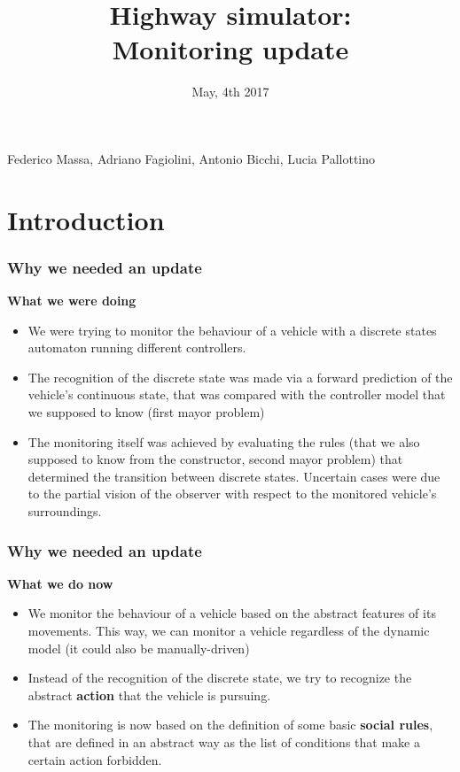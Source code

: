\documentclass{beamer}
\title{Highway simulator: \\
Monitoring update}
\date{\small May, 4th 2017}
\begin{document}

{
\begin{frame}
\titlepage
\bigskip
\medskip
\centering\small Federico Massa, Adriano Fagiolini, Antonio Bicchi, Lucia Pallottino
\end{frame}}
\addtocounter{framenumber}{-1}

\section{Introduction}
\begin{frame}
\frametitle{Why we needed an update}
\textbf{What we were doing}
\begin{itemize}
	\item We were trying to monitor the behaviour of a vehicle
		  with a discrete states automaton running different
		  controllers.
 	\item The recognition of the discrete state was made via 
 		  a forward prediction of the vehicle's continuous state,
 		  that was compared with the controller model that we
 		  supposed to know (first mayor problem)
  	\item The monitoring itself was achieved by evaluating the
  		  rules (that we also supposed to know from the constructor, second 
  		  mayor problem) that determined the transition between
  		  discrete states. Uncertain cases were due to the 
  		  partial vision of the observer with respect to the 
  		  monitored vehicle's surroundings.
\end{itemize}
\end{frame}

\begin{frame}
\frametitle{Why we needed an update}
\textbf{What we do now}
\begin{itemize}
	\item We monitor the behaviour of a vehicle based on the
		  abstract features of its movements. This way, we can
		  monitor a vehicle regardless of the dynamic model 
		  (it could also be manually-driven)
 	\item Instead of the recognition of the discrete state,
 		  we try to recognize the abstract \textbf{action} 
 		  that the vehicle is pursuing. 
  	\item The monitoring is now based on the definition
  		  of some basic \textbf{social rules}, that 
  		  are defined in an abstract way as the list of
  		  conditions that make a certain action forbidden.
\end{itemize}
\end{frame}
\end{document}
